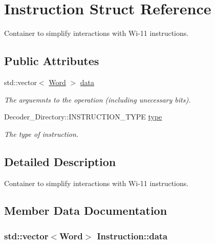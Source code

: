 \hypertarget{structInstruction}{
\section{Instruction Struct Reference}
\label{structInstruction}
}


Container to simplify interactions with Wi-\/11 instructions.  


\subsection*{Public Attributes}
\begin{DoxyCompactItemize}
\item 
std::vector$<$ \hyperlink{classWord}{Word} $>$ \hyperlink{structInstruction_a93f6b7366b14b17d8379ea952687960c}{data}
\begin{DoxyCompactList}\small\item\em The arguemnts to the operation (including unecessary bits). \item\end{DoxyCompactList}\item 
\hypertarget{structInstruction_a2f5e91a25d72c7ec993a1cb472602d95}{
Decoder\_\-Directory::INSTRUCTION\_\-TYPE \hyperlink{structInstruction_a2f5e91a25d72c7ec993a1cb472602d95}{type}}
\label{structInstruction_a2f5e91a25d72c7ec993a1cb472602d95}

\begin{DoxyCompactList}\small\item\em The type of instruction. \item\end{DoxyCompactList}\end{DoxyCompactItemize}


\subsection{Detailed Description}
Container to simplify interactions with Wi-\/11 instructions. 

\subsection{Member Data Documentation}
\hypertarget{structInstruction_a93f6b7366b14b17d8379ea952687960c}{
\subsubsection[{data}]{\setlength{\rightskip}{0pt plus 5cm}std::vector$<${\bf Word}$>$ {\bf Instruction::data}}}
\label{structInstruction_a93f6b7366b14b17d8379ea952687960c}


